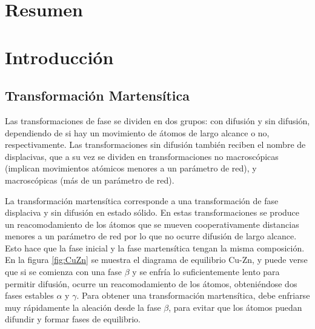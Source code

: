 \documentclass[a4paper,12pt,fleqn,twoside,openany]{book}
\begin{document}

\tableofcontents

\chapter*{Resumen}

\chapter{Introducción}

\section{Transformación Martensítica}

Las transformaciones de fase se dividen en dos grupos:  con difusión y sin difusión, dependiendo de si hay un movimiento de átomos de largo alcance o no,
respectivamente. Las transformaciones sin difusión también reciben el nombre de displacivas, que a su vez se dividen en transformaciones no macroscópicas
(implican movimientos atómicos menores a un parámetro de red), y macroscópicas (más de un parámetro de red).


La transformación martensítica corresponde a una transformación de fase displaciva y sin difusión en estado sólido. 
En estas transformaciones se produce un reacomodamiento de los átomos que se mueven cooperativamente distancias menores a un parámetro de red 
por lo que no ocurre difusión de largo alcance. Esto hace que la fase inicial y la fase martensítica tengan la misma composición. 
En la figura \ref{fig:CuZn} se muestra el diagrama de equilibrio Cu-Zn, y puede verse que si se comienza con una fase $\beta$ y se enfría lo 
suficientemente lento para permitir difusión, ocurre un reacomodamiento de los átomos, obteniéndose dos fases estables $\alpha$ y $\gamma$. 
Para obtener una transformación martensítica, debe enfriarse muy rápidamente la aleación desde la fase $\beta$, para evitar que los átomos puedan 
difundir y formar fases de equilibrio.

\end{document}
